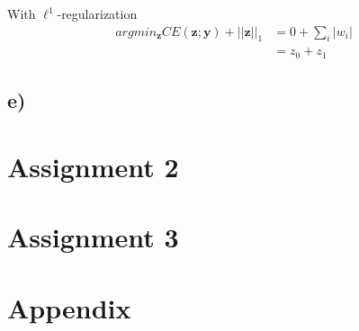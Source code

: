 \documentclass{article}
\begin{document}
With $\ell^1$-regularization
\begin{equation}
    \begin{split}
        argmin_\mathbf{z} CE(\mathbf{z}; \mathbf{y}) + ||\mathbf{z}||_1 &= 0 + \sum_i |w_i|\\
                                                                        &= z_0 + z_1
    \end{split}
\end{equation}

\subsection*{e)}

\section{Assignment 2}
\section{Assignment 3}

\section{Appendix} 
%     
\end{document}

